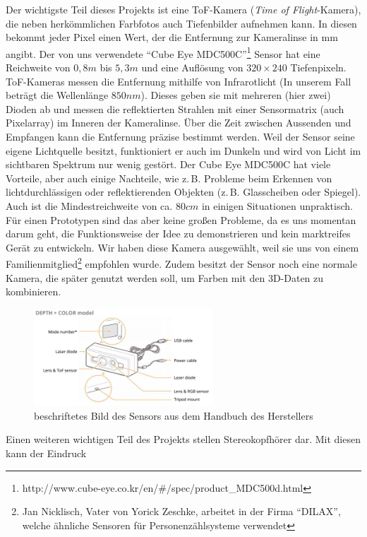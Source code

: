 \documentclass[a4paper,12pt,ngerman]{scrartcl}
\begin{document}
Der wichtigste Teil dieses Projekts ist eine ToF-Kamera (\textit{Time of Flight}-Kamera), die neben herkömmlichen Farbfotos 
auch Tiefenbilder aufnehmen kann.
In diesen bekommt jeder Pixel einen Wert, der die Entfernung zur Kameralinse in mm angibt.
Der von uns verwendete \enquote{Cube Eye MDC500C}\footnote{http://www.cube-eye.co.kr/en/\#/spec/product\_MDC500d.html}
Sensor hat eine Reichweite von $0,8 m$ bis $5,3 m$ und eine Auflösung von $320 \times 240$ Tiefenpixeln. 
ToF-Kameras messen die Entfernung mithilfe von Infrarotlicht (In unserem Fall beträgt die Wellenlänge $850nm$). Dieses geben sie mit mehreren (hier zwei) Dioden
ab und messen die reflektierten Strahlen mit einer Sensormatrix (auch Pixelarray) im Inneren der Kameralinse. 
Über die Zeit zwischen Aussenden und Empfangen kann die Entfernung präzise bestimmt werden.
Weil der Sensor seine eigene Lichtquelle besitzt, funktioniert er auch im Dunkeln und wird von Licht im 
sichtbaren Spektrum nur wenig gestört. Der Cube Eye MDC500C hat viele Vorteile, aber auch einige Nachteile, wie z.\,B. 
Probleme beim Erkennen von lichtdurchlässigen oder reflektierenden Objekten (z.\,B. Glasscheiben oder Spiegel). 
Auch ist die Mindestreichweite von ca. $80 cm$ in einigen Situationen unpraktisch. Für einen Prototypen sind das aber keine großen Probleme, da es uns momentan darum geht, die Funktionsweise der Idee zu demonstrieren und kein marktreifes
Gerät zu entwickeln. Wir haben diese Kamera ausgewählt, weil sie uns von einem 
Familienmitglied\footnote{Jan Nicklisch, Vater von Yorick Zeschke, arbeitet in der Firma
\enquote{DILAX}, welche ähnliche Sensoren für Personenzählsysteme verwendet} 
empfohlen wurde. Zudem besitzt der Sensor noch eine normale Kamera, die später genutzt werden soll, um Farben mit den 
3D-Daten zu kombinieren.
\begin{figure}[H]
	\centering
	\includegraphics[width=0.6\textwidth]{cube_eye}
	\caption{beschriftetes Bild des Sensors aus dem Handbuch des Herstellers}
	\label{cube_eye_sensor}
\end{figure} \par
Einen weiteren wichtigen Teil des Projekts stellen Stereokopfhörer dar. Mit diesen kann der Eindruck
\end{document}
